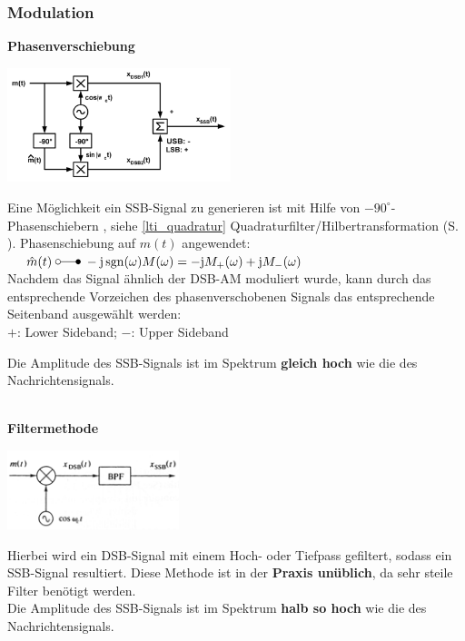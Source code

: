 \subsubsection{Modulation }
\textbf{Phasenverschiebung }  \\
\begin{minipage}[t][3.7cm][c]{7.0cm}
    \includegraphics[width=6.5cm]{bilder/am_ssb_modulationPhasenshifter.png}
\end{minipage}
\begin{minipage}[t][3.7cm][c]{11cm}	
	Eine Möglichkeit ein SSB-Signal zu generieren ist mit Hilfe von $ - 90^{\circ} $-Phasenschiebern , {\small siehe
	\ref{lti_quadratur} Quadraturfilter/Hilbertransformation (S. \pageref{lti_quadratur})}.
	Phasenschiebung auf $m(t)$ angewendet: \\
	$\hspace*{0.5cm}\hat{m}(t) \; \laplace \; -\im \sgn(\omega) M(\omega) = -\im M_+(\omega) + \im M_-(\omega)$ \\
	Nachdem das Signal \"ahnlich der DSB-AM moduliert wurde, kann durch das entsprechende Vorzeichen des phasenverschobenen Signals das entsprechende Seitenband ausgewählt werden:\\ 
	$+$: Lower Sideband; \qquad $-$: Upper Sideband
	
	Die Amplitude des SSB-Signals ist im Spektrum \textbf{gleich hoch} wie die des
	Nachrichtensignals.
\end{minipage}\\

\textbf{Filtermethode} \\
\begin{minipage}[t][2cm][c]{5.5cm}
    \includegraphics[width=5cm]{bilder/am_ssb_modulationFilter.png}
\end{minipage}
\begin{minipage}[t][2cm][c]{12.5cm}	
	Hierbei wird ein DSB-Signal mit einem Hoch- oder Tiefpass gefiltert, sodass ein SSB-Signal
	resultiert. Diese Methode ist in der \textbf{Praxis unüblich}, da sehr steile Filter benötigt
	werden.\\
	Die Amplitude des SSB-Signals ist im Spektrum \textbf{halb so hoch} wie die des
	Nachrichtensignals.
\end{minipage}

